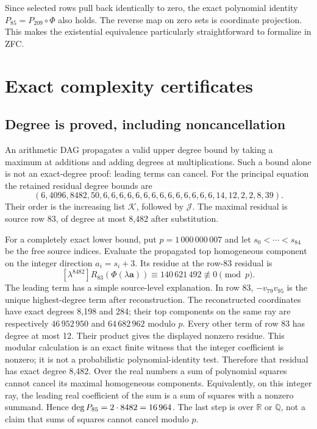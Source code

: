 \documentclass[11pt]{article}
\theoremstyle{definition}\newtheorem{definition}[theorem]{Definition}
\theoremstyle{remark}\newtheorem{remark}[theorem]{Remark}
\begin{document}
Since selected rows pull back identically to zero, the exact polynomial
identity $P_{85}=P_{209}\circ\Phi$ also holds. The reverse map on zero
sets is coordinate projection. This makes the existential equivalence
particularly straightforward to formalize in ZFC.

\section{Exact complexity certificates}
\label{sec:metrics}

\subsection{Degree is proved, including noncancellation}
An arithmetic DAG propagates a valid upper degree bound by taking a
maximum at additions and adding degrees at multiplications. Such a
bound alone is not an exact-degree proof: leading terms can cancel.
For the principal equation the retained residual degree bounds are
\[
 (6,4096,8482,50,6,6,6,6,6,6,6,6,6,6,6,6,6,6,
   14,12,2,2,8,39).
\]
Their order is the increasing list $\mathcal K$, followed by
$\mathcal J$. The maximal residual is source row 83, of degree at
most 8,482 after substitution.

For a completely exact lower bound, put $p=1\,000\,000\,007$ and let
$s_0<\cdots<s_{84}$ be the free source indices. Evaluate the propagated
top homogeneous component on the integer direction
$a_i=s_i+3$. Its residue at the row-83 residual is
\[
 [\lambda^{8482}]R_{83}(\Phi(\lambda\boldsymbol a))
       \equiv 140\,621\,492\not\equiv0\pmod p.
\]
The leading term has a simple source-level explanation. In row 83,
$-v_{79}v_{95}$ is the unique highest-degree term after reconstruction.
The reconstructed coordinates have exact degrees 8,198 and 284;
their top components on the same ray are respectively $46\,952\,950$
and $64\,682\,962$ modulo $p$. Every other term of row 83 has degree
at most 12. Their product gives the displayed nonzero residue.
This modular calculation is an exact finite witness that the integer
coefficient is nonzero; it is not a probabilistic polynomial-identity
test. Therefore that residual has exact degree 8,482.
Over the real numbers a sum of polynomial squares cannot cancel its
maximal homogeneous components. Equivalently, on this integer ray,
the leading real coefficient of the sum is a sum of squares with a
nonzero summand. Hence $\operatorname{deg} P_{85}=2\cdot8482=16\,964$.
The last step is over $\mathbb R$ or $\mathbb Q$, not a claim that
sums of squares cannot cancel modulo $p$.
\end{document}
